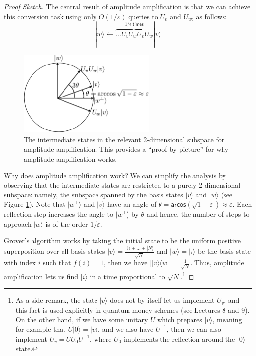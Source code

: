 \documentclass[12pt]{report}
\theoremstyle{plain}
\theoremstyle{definition}
\renewcommand{\ket}[1]{|#1\rangle}
\newcommand{\ketbra}[2]{|#1\rangle\!\langle#2|}
\begin{document}
\begin{proof}[Proof Sketch]
  The central result of amplitude amplification is that we can achieve this conversion task using only $O( 1/ \varepsilon)$ queries to $U_v$ and $U_w$, as follows:
$$
    \ket{w} \leftarrow \overbrace{\ldots U_v U_w U_v U_w}^{1 / \epsilon \;
    \mathsf{times}} \ket{v} $$

  \begin{figure}[h!]\label{fig:AmplitudAmplification}
  \begin{center}
\includegraphics[width=0.6\textwidth]{AmplitudeAmplification.pdf}
\caption{The intermediate states in the relevant 2-dimensional subspace for amplitude amplification.
This provides a ``proof by picture'' for why amplitude amplification works.}
\end{center}
\end{figure}
Why does amplitude amplification work?  We can simplify the analysis by observing that the intermediate states are restricted to a purely 2-dimensional subspace:
  namely, the subspace spanned by the basis states $\ket{ v }$ and $\ket{ w }$ (see Figure \ref{fig:AmplitudAmplification}).  Note that $\ket{ w^{\perp} }$ and $\ket {v }$ have an angle of $\theta = \mathsf{arcos} (\sqrt{1-\varepsilon})\approx \varepsilon$.
  Each reflection step increases the angle to $\ket{w^\perp}$ by $\theta$ and hence, the number of steps to approach $\ket{w}$ is of the order $1/\varepsilon$.

Grover's algorithm works by taking the initial state to be the uniform positive superposition over all basis states $\ket{ v } = \frac{\ket{1} +  \ldots + \ket{N}}{\sqrt{N}}$ and $\ket{w} = \ket{i}$ be the basis state with index $i$ such that $f (i) = 1$, then we have $| \ketbra{ v}{w } | =  \frac{1}{\sqrt{N}} $.
Thus, amplitude amplification lets us find $\ket{i}$ in a time proportional to $\sqrt{N}$.\footnote{As a side remark, the state $\ket{ v}$ does not by itself let us implement $U_v$, and
  this fact is used explicitly in quantum money schemes (see Lectures 8 and 9).
  On the other hand, if we  have some unitary $U$ which prepares $\ket{ v }$, meaning
  for example that $U \ket{ 0 } = \ket{ v }$, and we also have $U^{-1}$, then we can also implement $U_v = U U_0 U^{- 1}$, where $U_0$ implements the reflection around the $\ket{ 0 }$ state.}


\end{proof}
\end{document}
